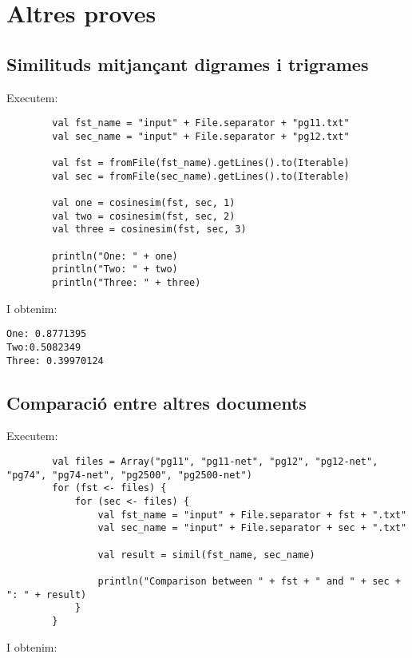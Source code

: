 \documentclass{article}
\begin{document}
\section{Altres proves}

\subsection{Similituds mitjançant digrames i trigrames}

Executem:

\begin{lstlisting}
        val fst_name = "input" + File.separator + "pg11.txt"
        val sec_name = "input" + File.separator + "pg12.txt"

        val fst = fromFile(fst_name).getLines().to(Iterable)
        val sec = fromFile(sec_name).getLines().to(Iterable)

        val one = cosinesim(fst, sec, 1)
        val two = cosinesim(fst, sec, 2)
        val three = cosinesim(fst, sec, 3)

        println("One: " + one)
        println("Two: " + two)
        println("Three: " + three)
\end{lstlisting}

I obtenim:

\begin{verbatim}
One: 0.8771395
Two:0.5082349
Three: 0.39970124
\end{verbatim}

\subsection{Comparació entre altres documents}

Executem:

\begin{lstlisting}
        val files = Array("pg11", "pg11-net", "pg12", "pg12-net", "pg74", "pg74-net", "pg2500", "pg2500-net")
        for (fst <- files) {
            for (sec <- files) {
                val fst_name = "input" + File.separator + fst + ".txt"
                val sec_name = "input" + File.separator + sec + ".txt"

                val result = simil(fst_name, sec_name)

                println("Comparison between " + fst + " and " + sec + ": " + result)
            }
        }
\end{lstlisting}

I obtenim:
\end{document}
